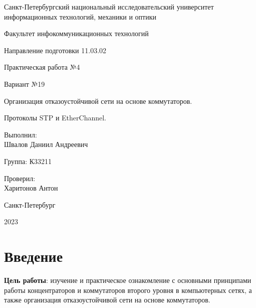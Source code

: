 \documentclass[a4paper, 14pt]{extarticle}
\begin{document}
\begin{titlepage}
  \vspace{0pt plus2fill}
  \noindent

  \vspace{0pt plus6fill}
  \begin{center}
    Санкт-Петербургский национальный исследовательский университет
    информационных технологий, механики и оптики

    \vspace{0pt plus2fill}

    Факультет инфокоммуникационных технологий

    Направление подготовки 11.03.02

    \vspace{0pt plus2fill}

    Практическая работа №4

    Вариант №19

    \vspace{0pt plus1fill}

    Организация отказоустойчивой сети на основе коммутаторов.

    Протоколы STP и EtherChannel.

  \end{center}

  \vspace{0pt plus7fill}
  \begin{flushright}
    Выполнил: \\
    Швалов Даниил Андреевич

    Группа: К33211

    Проверил: \\
    Харитонов Антон
  \end{flushright}

  \vspace{0pt plus2fill}
  \begin{center}
    Санкт-Петербург

    2023
  \end{center}
\end{titlepage}

\setcounter{page}{2}

\section{Введение}

\textbf{Цель работы}: изучение и практическое ознакомление с основными
принципами работы концентраторов и коммутаторов второго уровня в компьютерных
сетях, а также организация отказоустойчивой сети на основе коммутаторов.
\end{document}
